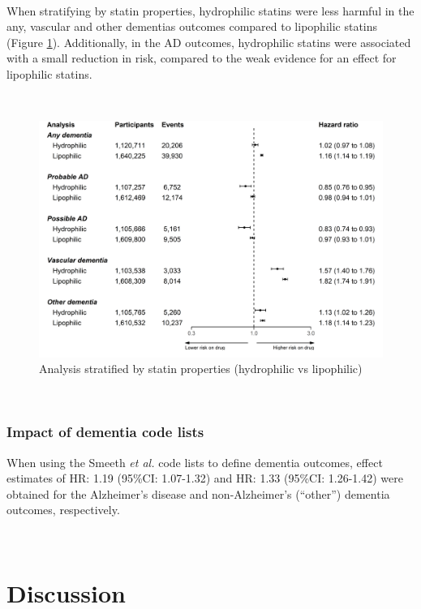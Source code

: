 \documentclass[a4paper, twoside]{templates/ociamthesis}
\begin{document}
~

When stratifying by statin properties, hydrophilic statins were less harmful in the any, vascular and other dementias outcomes compared to lipophilic statins (Figure \ref{fig:statinTypeFig}). Additionally, in the AD outcomes, hydrophilic statins were associated with a small reduction in risk, compared to the weak evidence for an effect for lipophilic statins.

~





\begin{figure}[H]
\includegraphics[width=1\linewidth]{figures/cprd-analysis/forester_sta_type} \caption[Analysis stratified by statin properties]{Analysis stratified by statin properties (hydrophilic vs lipophilic)}\label{fig:statinTypeFig}
\end{figure}

~

\hypertarget{comparing-codelists}{%
\subsubsection{Impact of dementia code lists}\label{comparing-codelists}}

When using the Smeeth \emph{et al.} code lists to define dementia outcomes, effect estimates of HR: 1.19 (95\%CI: 1.07-1.32) and HR: 1.33 (95\%CI: 1.26-1.42) were obtained for the Alzheimer's disease and non-Alzheimer's (``other'') dementia outcomes, respectively.

~

\hypertarget{discussion-2}{%
\section{Discussion}\label{discussion-2}}
\end{document}
